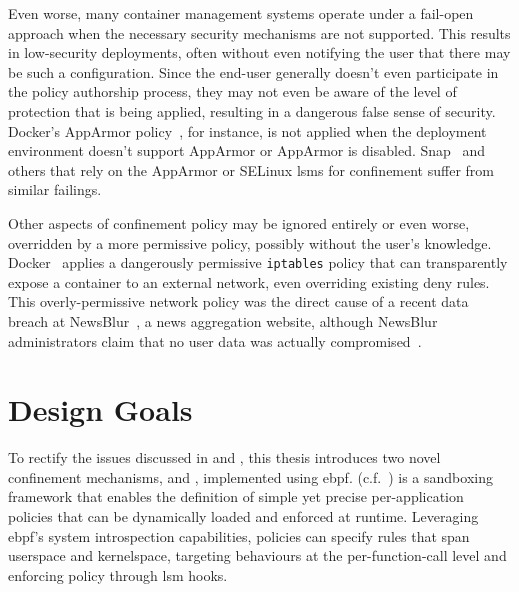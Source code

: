 Even worse, many container management systems operate under a fail-open approach when the
necessary security mechanisms are not supported. This results in low-security deployments,
often without even notifying the user that there may be such a configuration. Since the
end-user generally doesn't even participate in the policy authorship process, they may not
even be aware of the level of protection that is being applied, resulting in a dangerous
false sense of security. Docker's AppArmor policy~\cite{docker_apparmor,
docker_default_apparmor}, for instance, is not applied when the deployment environment
doesn't support AppArmor or AppArmor is disabled. Snap~\cite{snap} and others that rely on
the AppArmor or SELinux \glspl{lsm} for confinement suffer from similar failings.

Other aspects of confinement policy may be ignored entirely or even worse, overridden by
a more permissive policy, possibly without the user's knowledge.
Docker~\cite{docker_security} applies a dangerously permissive \texttt{iptables} policy
that can transparently expose a container to an external network, even overriding existing
deny rules. This overly-permissive network policy was the direct cause of a recent data
breach at NewsBlur~\cite{newsblur}, a news aggregation website, although NewsBlur
administrators claim that no user data was actually compromised~\cite{newsblur}.



\section{Design Goals}%
\label{s:cp-design}


To rectify the issues discussed in  and , this
thesis introduces two novel confinement mechanisms, \bpfbox{} and \bpfcontain{},
implemented using \gls{ebpf}. \bpfbox{} (c.f.~) is a sandboxing framework
that enables the definition of simple yet precise per-application policies that can be
dynamically loaded and enforced at runtime. Leveraging \gls{ebpf}'s system
introspection capabilities, \bpfbox{} policies can specify rules that span userspace and
kernelspace, targeting behaviours at the per-function-call level and enforcing policy
through \gls{lsm} hooks.


